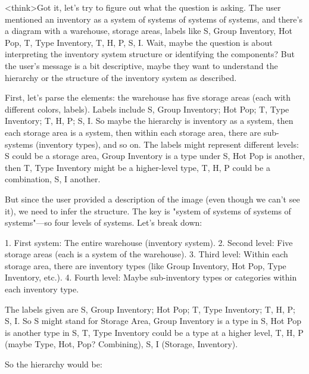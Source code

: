 <think>Got it, let's try to figure out what the question is asking. The user mentioned an inventory as a system of systems of systems of systems, and there's a diagram with a warehouse, storage areas, labels like S, Group Inventory, Hot Pop, T, Type Inventory, T, H, P, S, I. Wait, maybe the question is about interpreting the inventory system structure or identifying the components? But the user's message is a bit descriptive, maybe they want to understand the hierarchy or the structure of the inventory system as described.

First, let's parse the elements: the warehouse has five storage areas (each with different colors, labels). Labels include S, Group Inventory; Hot Pop; T, Type Inventory; T, H, P; S, I. So maybe the hierarchy is inventory as a system, then each storage area is a system, then within each storage area, there are sub-systems (inventory types), and so on. The labels might represent different levels: S could be a storage area, Group Inventory is a type under S, Hot Pop is another, then T, Type Inventory might be a higher-level type, T, H, P could be a combination, S, I another. 

But since the user provided a description of the image (even though we can't see it), we need to infer the structure. The key is "system of systems of systems of systems"—so four levels of systems. Let's break down:

1. First system: The entire warehouse (inventory system).
2. Second level: Five storage areas (each is a system of the warehouse).
3. Third level: Within each storage area, there are inventory types (like Group Inventory, Hot Pop, Type Inventory, etc.).
4. Fourth level: Maybe sub-inventory types or categories within each inventory type.

The labels given are S, Group Inventory; Hot Pop; T, Type Inventory; T, H, P; S, I. So S might stand for Storage Area, Group Inventory is a type in S, Hot Pop is another type in S, T, Type Inventory could be a type at a higher level, T, H, P (maybe Type, Hot, Pop? Combining), S, I (Storage, Inventory). 

So the hierarchy would be:

